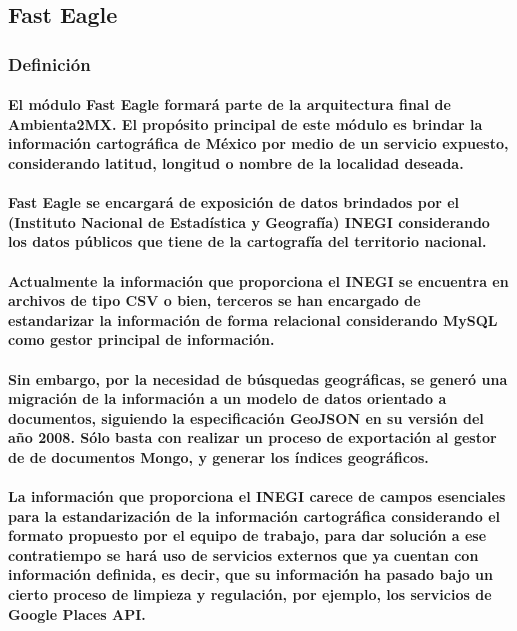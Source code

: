 \subsection{Fast Eagle}
    \subsubsection{Definición}
      \paragraph{El módulo Fast Eagle formará parte de la arquitectura final de Ambienta2MX. El propósito principal de este módulo es brindar la información cartográfica de México por medio de un servicio expuesto, considerando latitud, longitud o nombre de la localidad deseada.}
      \paragraph{Fast Eagle se encargará de exposición de datos brindados por el (Instituto Nacional de Estadística y Geografía) INEGI considerando los datos públicos que tiene de la cartografía del territorio nacional.}
      \paragraph{Actualmente la información que proporciona el INEGI se encuentra en archivos de tipo CSV o bien, terceros se han encargado de estandarizar la información de forma relacional considerando MySQL como gestor principal de información.}
      \paragraph{Sin embargo, por la necesidad de búsquedas geográficas, se generó una migración de la información a un modelo de datos orientado a documentos, siguiendo la especificación GeoJSON en su versión del año 2008. Sólo basta con realizar un proceso de exportación al gestor de de documentos Mongo, y generar los índices geográficos. \cite{35}}
      \paragraph{La información que proporciona el INEGI carece de campos esenciales para la estandarización de la información cartográfica considerando el formato propuesto por el equipo de trabajo, para dar solución a ese contratiempo se hará uso de servicios externos que ya cuentan con información definida, es decir, que su información ha pasado bajo un cierto proceso de limpieza y regulación, por ejemplo, los servicios de Google Places API.}
